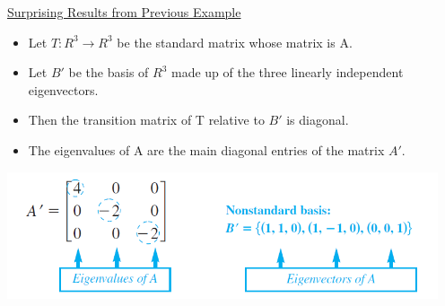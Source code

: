 \documentclass[12pt]{article}
\begin{document}
\pagebreak
\begin{center}
\underline{Surprising Results from Previous Example}
\end{center}

\begin{itemize}
\item
Let $T: R^3 \rightarrow R^3$ be the standard matrix whose matrix is A.

\item
Let $B'$ be the basis of $R^3$ made up of the three linearly independent eigenvectors.

\item
Then the transition matrix of T relative to $B'$ is diagonal. 

\item
The eigenvalues of A are the main diagonal entries of the matrix $A'$.


\end{itemize}


\vspace{.1in}

\includegraphics[width=5in]{ex2}
\end{document}
